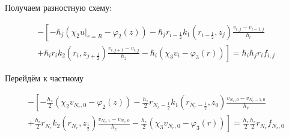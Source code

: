 Получаем разностную схему:

\begin{align*}
  - \left [ 
  -\hbar_j (\chi_2 \left . u \right \vert_{r=R} - \varphi_2(z) )
  - \hbar_j r_{i-\frac{1}{2}} k_1(r_{i-\frac{1}{2}}, z_j) \frac{v_{i, j} - v_{i - 1, j}}{h_{r}}
  \right . \\
  \left .
  + \hbar_i r_{i} k_2(r_i, z_{j+\frac{1}{2}}) \frac{v_{i, j + 1} - v_{i, j}}{h_{z}}
  - \hbar_i(\chi_3 v_i - \varphi_3(r))
  \right ]  = \hbar_i \hbar_j r_i f_{i, j}
\end{align*}

Перейдём к частному

\begin{align*}
  - \left [ 
  -\frac{h_z}{2} (\chi_2 v_{N_r, 0} - \varphi_2(z) )
  - \frac{h_z}{2} r_{N_r-\frac{1}{2}} k_1(r_{N_r-\frac{1}{2}}, z_0) \frac{v_{N_r, 0} - v_{N_r - 1, 0}}{h_{r}}
  \right . \\
  \left .
  + \frac{h_r}{2} r_{N_r} k_2(r_{N_r}, z_{\frac{1}{2}}) \frac{v_{N_r, 1} - v_{N_r, 0}}{h_{z}}
  - \frac{h_r}{2}(\chi_3 v_{N_r, 0} - \varphi_3(r))
  \right ]  = \frac{h_r}{2} \frac{h_z}{2} r_{N_r} f_{N_r, 0}
\end{align*}